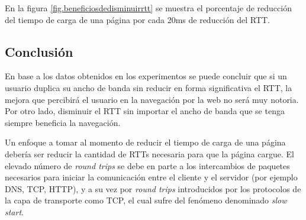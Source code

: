 En la figura \ref{fig.beneficiosdedisminuirrtt} se muestra el porcentaje de reducción del tiempo de carga de una página por cada 20ms de reducción del RTT.

\subsection{Conclusión}

En base a los datos obtenidos en los experimentos se puede concluir que si un usuario duplica su ancho de banda sin reducir en forma significativa el RTT, la mejora
que percibirá el usuario en la navegación por la web no será muy notoria. Por otro lado, disminuir el RTT sin importar el ancho de banda que se tenga siempre beneficia
la navegación.

Un enfoque a tomar al momento de reducir el tiempo de carga de una página debería ser reducir la cantidad de RTTs necesaria para que la página cargue. El elevado número
de \emph{round trips} se debe en parte a los intercambios de paquetes necesarios para iniciar la comunicación entre el cliente y el servidor (por ejemplo DNS, TCP, HTTP),
y a su vez por \emph{round trips} introducidos por los protocolos de la capa de transporte como TCP, el cual sufre del fenómeno denominado \emph{slow start}.

